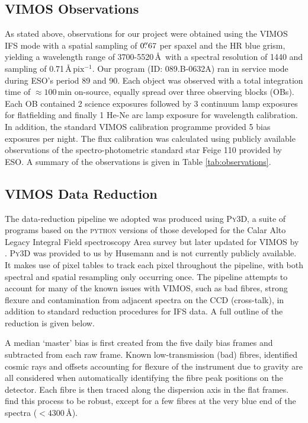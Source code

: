 	\subsection{VIMOS Observations}
		As stated above,  observations for our project were obtained using the VIMOS IFS mode with a spatial sampling of $0\hbox{$.\!\!^{\prime\prime}$}67$ per spaxel and the HR blue grism, yielding a wavelength range of 3700-5520\,\AA\ with a spectral resolution of 1440 and sampling of 0.71\,\AA\,$\mathrm{pix^{-1}}$. Our program (ID: 089.B-0632A) ran in service mode during ESO's period 89 and 90. Each object was observed with a total integration time of $\approx 100$\,min on-source, equally spread over three observing blocks (OBs). Each OB contained 2 science exposures followed by 3 continuum lamp exposures for flatfielding and finally 1 He-Ne arc lamp exposure for wavelength calibration. In addition, the standard VIMOS calibration programme provided 5 bias exposures per night. The flux calibration was calculated using publicly available observations of the spectro-photometric standard star Feige 110 provided by ESO. A summary of the observations is given in Table \ref{tab:observations}.

	\subsection{VIMOS Data Reduction}
		\label{subsec:VIMOSreduction}
		The data-reduction pipeline we adopted was produced using \textsc{Py3D}, a suite of programs based on the \textsc{python} versions of those developed for the Calar Alto Legacy Integral Field spectroscopy Area survey \citep[CALIFA;][]{Sanchez2012, Husemann2013} but later updated for VIMOS by \citet{Husemann2014}. \textsc{Py3D} was provided to us by Husemann and is not currently publicly available. It  makes use of pixel tables to track each pixel throughout the pipeline, with both spectral and spatial resampling only occurring once. The pipeline attempts to account for many of the known issues with VIMOS, such as bad fibres, strong flexure and contamination from adjacent spectra on the CCD (cross-talk), in addition to standard reduction procedures for IFS data. A full outline of the reduction is given below.

		A median `master' bias is first created from the five daily bias frames and subtracted from each raw frame. Known low-transmission (bad) fibres, identified cosmic rays and offsets accounting for flexure of the instrument due to gravity are all considered when automatically identifying the fibre peak positions on the detector. Each fibre is then traced along the dispersion axis in the flat frames. \citet{Husemann2014} find this process to be robust, except for a few fibres at the very blue end of the spectra ($<4300$\,\AA). 

